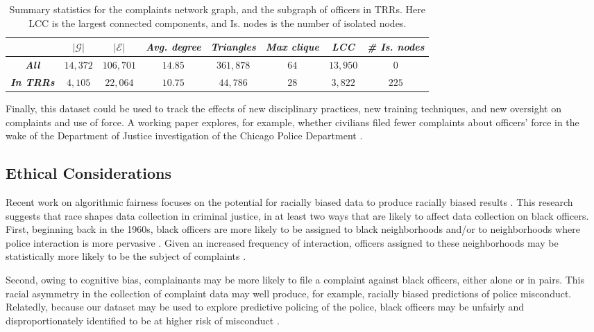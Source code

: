 \begin{table}[t!]
\caption{Summary statistics for the complaints network graph, and the subgraph
of officers in TRRs. Here LCC is the largest connected components, and Is.
nodes is the number of isolated nodes.}\label{tab:network}
\begin{tabular}{c|c|c|c|c|c|c|c|}
\cline{2-8}
                                                & $|\mathcal{G}|$ & $|\mathcal{E}|$ & \textit{Avg. degree} & \textit{Triangles} & \textit{Max clique} & \textit{LCC} & \textit{\# Is. nodes} \\ \hline
\multicolumn{1}{|c|}{\textit{\textbf{All}}}     & $14{,}372$      & $106{,}701$     & $14.85$              & $361{,}878$        & $64$                & $13{,}950$   & $0$                   \\ \hline
\multicolumn{1}{|c|}{\textit{\textbf{In TRRs}}} & $4{,}105$       & $22{,}064$      & $10.75$              & $44{,}786$         & $28$                & $3{,}822$    & $225$                 \\ \hline
\end{tabular} \label{tab:stats_graphs}
\end{table}

Finally, this dataset could be used to track the effects of new disciplinary
practices, new training techniques, and new oversight on complaints and use of
force. A working paper explores, for example, whether civilians filed fewer
complaints about officers' force in the wake of the Department of Justice
investigation of the Chicago Police Department \cite{Travers20}. 

\subsection{Ethical Considerations}
Recent work on algorithmic fairness focuses on the potential for racially
biased data to produce racially biased results
\cite{veale2018fairness,sloane2019ai,d2020fairness}.  This research suggests
that race shapes data collection in criminal justice, in at least two ways that
are likely to affect data collection on black officers. First, beginning back
in the 1960s, black officers are more likely to be assigned to black
neighborhoods and/or to neighborhoods where police interaction is more
pervasive \cite{Kuykendall80}. Given an increased frequency of interaction,
officers assigned to these neighborhoods may be statistically more likely to be
the subject of complaints \cite{Kane06}. 

Second, owing to cognitive bias, complainants may be more likely to file a
complaint against black officers, either alone or in pairs. This racial
asymmetry in the collection of complaint data may well produce, for example,
racially biased predictions of police misconduct. Relatedly, because our
dataset may be used to explore predictive policing of the police, black
officers may be unfairly and disproportionately identified to be at higher risk
of misconduct \cite{veale2018fairness,sloane2019ai,d2020fairness,Wood19}. 


